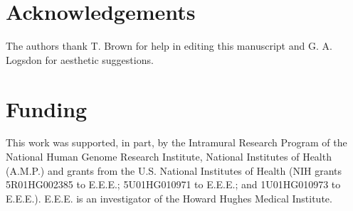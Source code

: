 \documentclass{bioinfo}
\begin{document}
\section*{Acknowledgements}
The authors thank T. Brown for help in editing this manuscript 
and G. A. Logsdon for aesthetic suggestions.

\section*{Funding}
This work was supported, in part,
by the Intramural Research Program of the National Human Genome Research Institute,
National Institutes of Health (A.M.P.) and grants from the U.S. National Institutes of
Health (NIH grants 5R01HG002385 to E.E.E.; 5U01HG010971 to E.E.E.; and 1U01HG010973 to
E.E.E.). E.E.E. is an investigator of the Howard Hughes Medical Institute.

%
%
%
%
%
%
%
%
%


\end{document}

